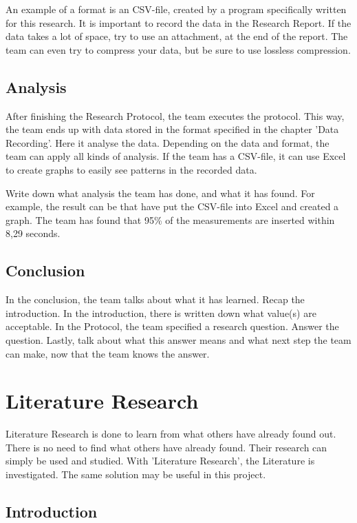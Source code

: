 \documentclass[10pt]{report}
\begin{document}
An example of a format is an CSV-file, created by a program specifically written for this research. It is important to record the data in the Research Report. If the data takes a lot of space, try to use an attachment, at the end of the report. The team can even try to compress your data, but be sure to use lossless compression.

\subsection{Analysis}

After finishing the Research Protocol, the team executes the protocol. This way, the team ends up with data stored in the format specified in the chapter 'Data Recording'. Here it analyse the data. Depending on the data and format, the team can apply all kinds of analysis. If the team has a CSV-file, it can use Excel to create graphs to easily see patterns in the recorded data.

Write down what analysis the team has done, and what it has found. For example, the result can be that have put the CSV-file into Excel and created a graph. The team has found that 95\% of the measurements are inserted within 8,29 seconds.

\subsection{Conclusion}

In the conclusion, the team talks about what it has learned. Recap the introduction. In the introduction, there is written down what value(s) are acceptable. In the Protocol, the team specified a research question. Answer the question. Lastly, talk about what this answer means and what next step the team can make, now that the team knows the answer.

\newpage

\section{Literature Research}

Literature Research is done to learn from what others have already found out. There is no need to find what others have already found. Their research can simply be used and studied. With 'Literature Research', the Literature is investigated. The same solution may be useful in this project.

\subsection{Introduction}
\end{document}
